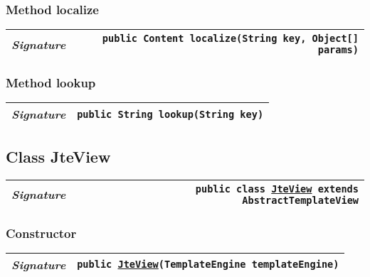 \begin{adjustwidth}{1.5em}{0pt}
\begin{adjustwidth}{1.5em}{0pt}
\begin{adjustwidth}{1.5em}{0pt}
{\begin{tabularx}{1.0\linewidth}{@{}l R@{}}
      \end{tabularx}}
    \end{adjustwidth}\subsubsection{Method localize\label{edu.kit.hci.soli.config.template.JteContext@localize(java.lang.String,java.lang.Object[])}}
    \begin{adjustwidth}{1.5em}{0pt}
      {\begin{tabularx}{1.0\linewidth}{@{}l R@{}}
        \emph{Signature} & \texttt{public \texttt{Content} localize(\texttt{String} key, \texttt{Object[]} params)} \\
        \hline
  
      \end{tabularx}}
    \end{adjustwidth}\subsubsection{Method lookup\label{edu.kit.hci.soli.config.template.JteContext@lookup(java.lang.String)}}
    \begin{adjustwidth}{1.5em}{0pt}
      {\begin{tabularx}{1.0\linewidth}{@{}l R@{}}
        \emph{Signature} & \texttt{public \texttt{String} lookup(\texttt{String} key)} \\
        \hline
  
      \end{tabularx}}
    \end{adjustwidth}
  \end{adjustwidth}\subsection{Class JteView\label{edu.kit.hci.soli.config.template.JteView} }
  \begin{adjustwidth}{1.5em}{0pt}
    {\begin{tabularx}{1.0\linewidth}{@{}l R@{}}
      \emph{Signature} & \texttt{public  class \texttt{\hyperref[edu.kit.hci.soli.config.template.JteView]{\texttt{JteView}} extends \texttt{AbstractTemplateView}}} \\
      \hline
  
    \end{tabularx}}\subsubsection{Constructor\label{edu.kit.hci.soli.config.template.JteView@edu.kit.hci.soli.config.template.JteView(gg.jte.TemplateEngine)}}
    \begin{adjustwidth}{1.5em}{0pt}
      {\begin{tabularx}{1.0\linewidth}{@{}l R@{}}
        \emph{Signature} & \texttt{public \texttt{\hyperref[edu.kit.hci.soli.config.template.JteView]{\texttt{JteView}}}(\texttt{TemplateEngine} templateEngine)} \\
        \hline
  

\end{tabularx}}
\end{adjustwidth}
\end{adjustwidth}
\end{adjustwidth}
